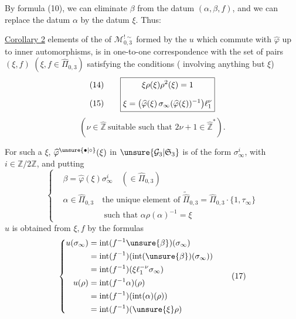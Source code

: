 By formula (10), we can eliminate $\beta$ from the datum
$(\alpha,\beta,f)$, and we can replace the datum $\alpha$ by the datum
$\xi$. Thus:


\uline{Corollary 2}  elements of the  of
$\mathcal M_{0,3}^{!\sim}$ formed by the $u$ which commute with
$\widehat\varphi$ up to inner automorphisms, is  in one-to-one correspondence with
the set of pairs $(\xi,f)$ \deleted{\unsure{$\in$}}
$(\xi,f\in\widehat\Pi_{0,3})$ satisfying the conditions
( involving anything but $\xi$)
\[
\begin{array}{c@{\qquad}c}
\begin{gathered}(14)\\[1.8ex](15)\end{gathered}
&
\boxed{\begin{gathered}
\xi\rho(\xi)\rho^2(\xi)=1\\[1.8ex]
\xi=\bigl(\widehat\varphi(\xi)\,
\sigma_\infty(\widehat\varphi(\xi))^{-1}\bigr)\ell_1^\nu
\end{gathered}}
\end{array}
\]
\[
(\nu\in\widehat{\mathbb Z}\ \text{suitable such that }
2\nu+1\in\widehat{\mathbb Z}^{*}).
\]

For such a $\xi$, $\widehat\varphi^{\unsure{\bullet|\circ}}(\xi)$
in $\unsure{\mathcal G_3|\mathfrak S_3}$ is of the form
$\sigma_\infty^i$, with $i\in\mathbb Z/2\mathbb Z$, and putting
\[
\left\{\begin{aligned}
&\beta=\widehat\varphi(\xi)\sigma_\infty^i
  \quad(\in\widehat\Pi_{0,3})\\
&\alpha\in\widehat\Pi_{0,3}\quad
  \text{the unique element of }\widetilde{\widehat\Pi}_{0,3}
  =\widehat\Pi_{0,3}\cdot\{1,\tau_\infty\}\\
&\hspace{5em}\text{such that }\alpha\rho(\alpha)^{-1}=\xi
\end{aligned}\right.
\tag{16}
\]
$u$ is obtained from $\xi,f$ by the formulas
\[
\left\{\begin{aligned}
u(\sigma_\infty)
 &=\operatorname{int}(f^{-1}\unsure{\beta})(\sigma_\infty)\\
 &=\operatorname{int}(f^{-1})(\operatorname{int}(\unsure{\beta})(\sigma_\infty))\\
 &=\operatorname{int}(f^{-1})(\xi\ell_1^{-\nu}\sigma_\infty)\\
u(\rho)
 &=\operatorname{int}(f^{-1}\alpha)(\rho)\\
 &=\operatorname{int}(f^{-1})(\operatorname{int}(\alpha)(\rho))\\
 &=\operatorname{int}(f^{-1})(\unsure{\xi}\rho)
\end{aligned}\right.
\tag{17}
\]

